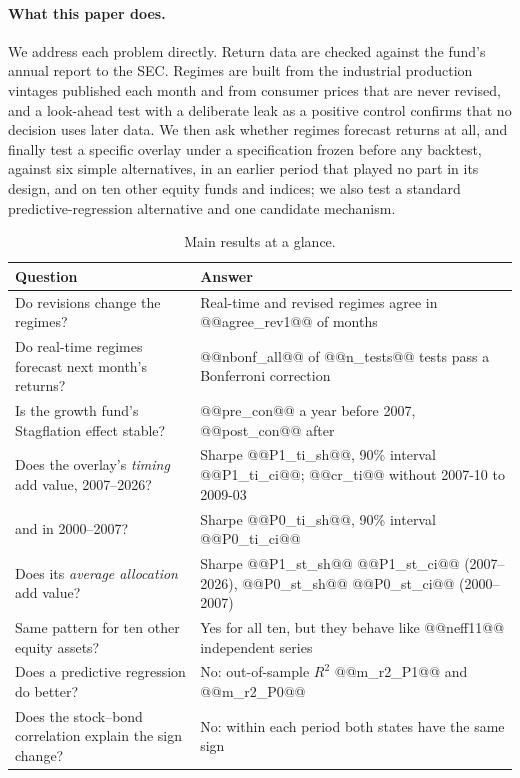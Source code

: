 \documentclass[11pt,a4paper]{article}
\begin{document}
\paragraph{What this paper does.} We address each problem directly. Return data are checked against the
fund's annual report to the SEC. Regimes are built from the industrial production vintages published each
month and from consumer prices that are never revised, and a look-ahead test with a deliberate leak as a
positive control confirms that no decision uses later data. We then ask whether regimes forecast returns at
all, and finally test a specific overlay under a specification frozen before any backtest, against six simple
alternatives, in an earlier period that played no part in its design, and on ten other equity funds and
indices; we also test a standard predictive-regression alternative and one candidate mechanism.

\begin{table}[htbp]
\centering
\caption{Main results at a glance.}
\label{tab:glance}
\small
\begin{tabular}{@{}p{}p{}@{}}
\toprule
Question & Answer \\
\midrule
Do revisions change the regimes? & Real-time and revised regimes agree in @@agree_rev1@@ of months \\
Do real-time regimes forecast next month's returns? & @@nbonf_all@@ of @@n_tests@@ tests pass a Bonferroni correction \\
Is the growth fund's Stagflation effect stable? & @@pre_con@@ a year before 2007, @@post_con@@ after \\
Does the overlay's \emph{timing} add value, 2007--2026? & Sharpe @@P1_ti_sh@@, 90\% interval @@P1_ti_ci@@; @@cr_ti@@ without 2007-10 to 2009-03 \\
\quad and in 2000--2007? & Sharpe @@P0_ti_sh@@, 90\% interval @@P0_ti_ci@@ \\
Does its \emph{average allocation} add value? & Sharpe @@P1_st_sh@@ @@P1_st_ci@@ (2007--2026), @@P0_st_sh@@ @@P0_st_ci@@ (2000--2007) \\
Same pattern for ten other equity assets? & Yes for all ten, but they behave like @@neff11@@ independent series \\
Does a predictive regression do better? & No: out-of-sample $R^2$ @@m_r2_P1@@ and @@m_r2_P0@@ \\
Does the stock--bond correlation explain the sign change? & No: within each period both states have the same sign \\
\bottomrule
\end{tabular}
\end{table}
\end{document}
